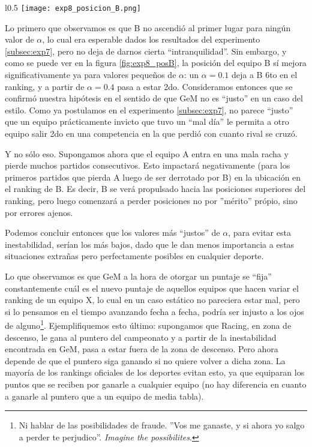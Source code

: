\begin{wrapfigure}{l}{0.5\textwidth}
    \texttt{[image: exp8\_posicion\_B.png]}
    \caption{Posici\'on del equipo B en el ranking en funci\'on del factor
        $\alpha$ ($c=\alpha$)}
    \label{fig:exp8_posB}
\end{wrapfigure}
\noindent

\par Lo primero que observamos es que B no ascendió al primer lugar para ningún
valor de $\alpha$, lo cual era esperable dados los resultados del experimento
\ref{subsec:exp7}, pero no deja de darnos cierta ``intranquilidad''. Sin embargo,
y como se puede ver en la figura \ref{fig:exp8_posB}, la posición del equipo B
sí mejora significativamente ya para valores pequeños de $\alpha$: un $\alpha =
0.1$ deja a B 6to en el ranking, y a partir de $\alpha = 0.4$ pasa a estar 2do.
Consideramos entonces que se confirmó nuestra hipótesis en el sentido de que GeM
no es ``justo'' en un caso del estilo. Como ya postulamos en el experimento
\ref{subsec:exp7}, no parece ``justo'' que un equipo prácticamente invicto que
tuvo un ``mal día'' le permita a otro equipo salir 2do en una competencia en la
que perdió con cuanto rival se cruzó.

\par Y no s\'olo eso. Supongamos ahora que el equipo A entra en una mala racha
y pierde muchos partidos consecutivos. Esto impactar\'a negativamente (para los
primeros partidos que pierda A luego de ser derrotado por B) en la ubicaci\'on
en el ranking de B. Es decir, B se ver\'a propulsado hacia las posiciones
superiores del ranking, pero luego comenzar\'a a perder posiciones no por
''m\'erito'' pr\'opio, sino por errores ajenos.

\par Podemos concluir entonces que los valores más ``justos'' de $\alpha$, para
evitar esta inestabilidad, serían los más bajos, dado que le dan menos
importancia a estas situaciones extrañas pero perfectamente posibles en
cualquier deporte.

\par Lo que observamos es que GeM a la hora de otorgar un puntaje se ``fija''
constantemente cuál es el nuevo puntaje de aquellos equipos que hacen variar el
ranking de un equipo X, lo cual en un caso est\'atico no pareciera estar mal,
pero si lo pensamos en el tiempo avanzando fecha a fecha, podr\'ia ser injusto a
los ojos de alguno\footnote{Ni hablar de las posibilidades de fraude. ''Vos me
ganaste, y si ahora yo salgo a perder te perjudico''. \emph{Imagine the
possibilites}.}. Ejemplifiquemos esto \'ultimo: supongamos que Racing, en zona
de descenso, le gana al puntero del campeonato y a partir de la inestabilidad
encontrada en GeM, pasa a estar fuera de la zona de descenso. Pero ahora depende
de que el puntero siga ganando si no quiere volver a dicha zona. La mayor\'ia de
los rankings oficiales de los deportes evitan esto, ya que equiparan los puntos
que se reciben por ganarle a cualquier equipo (no hay diferencia en cuanto a
ganarle al puntero que a un equipo de media tabla).

